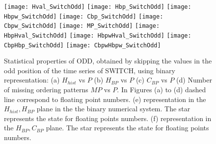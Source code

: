 \begin{figure}
	\texttt{[image: Hval\_SwitchOdd]}
	\texttt{[image: Hbp\_SwitchOdd]}
	\texttt{[image: Hbpw\_SwitchOdd]}
	\texttt{[image: Cbp\_SwitchOdd]}
	\texttt{[image: Cbpw\_SwitchOdd]}
	\texttt{[image: MP\_SwitchOdd]}
	\texttt{[image: HbpHval\_SwitchOdd]}
	\texttt{[image: HbpwHval\_SwitchOdd]}
	\texttt{[image: CbpHbp\_SwitchOdd]}
	\texttt{[image: CbpwHbpw\_SwitchOdd]}
	\caption{Statistical properties of ODD, obtained by skipping the values in the odd position of the time series of  SWITCH,  using binary representation: (a) $H_{hist}$ vs $P$ (b) $H_{BP}$ vs $P$ (c) $C_{BP}$ vs $P$ (d) Number of missing ordering patterns $MP$ vs $P$. In Figures (a) to (d) dashed line correspond to floating point numbers. (e) representation in the $H_{hist},H_{BP}$ plane in the the binary numerical system.  The star represents the state for floating points numbers. (f) representation in the $H_{BP},C_{BP}$ plane.  The star represents the state for floating points numbers.  } \label{fig:odd}
\end{figure}